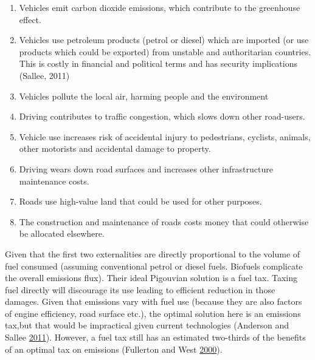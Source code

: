 \documentclass[]{tufte-handout}
\providecommand{\tightlist}{%
  \setlength{\itemsep}{0pt}\setlength{\parskip}{0pt}}
\begin{document}
\begin{enumerate}
\def\labelenumi{\arabic{enumi}.}
\tightlist
\item
  Vehicles emit carbon dioxide emissions, which contribute to the
  greenhouse effect.
\item
  Vehicles use petroleum products (petrol or diesel) which are imported
  (or use products which could be exported) from unstable and
  authoritarian countries. This is costly in financial and political
  terms and has security implications (Sallee, 2011)
\item
  Vehicles pollute the local air, harming people and the environment
\item
  Driving contributes to traffic congestion, which slows down other
  road-users.
\item
  Vehicle use increases risk of accidental injury to pedestrians,
  cyclists, animals, other motorists and accidental damage to property.
\item
  Driving wears down road surfaces and increases other infrastructure
  maintenance costs.
\item
  Roads use high-value land that could be used for other purposes.
\item
  The construction and maintenance of roads costs money that could
  otherwise be allocated elsewhere.
\end{enumerate}

Given that the first two externalities are directly proportional to the
volume of fuel consumed (assuming conventional petrol or diesel fuels.
Biofuels complicate the overall emissions flux). Their ideal Pigouvian
solution is a fuel tax. Taxing fuel directly will discourage its use
leading to efficient reduction in those damages. Given that emissions
vary with fuel use (because they are also factors of engine efficiency,
road surface etc.), the optimal solution here is an emissions tax,but
that would be impractical given current technologies (Anderson and
Sallee \protect\hyperlink{ref-Anderson2011}{2011}). However, a fuel tax
still has an estimated two-thirds of the benefits of an optimal tax on
emissions (Fullerton and West
\protect\hyperlink{ref-Fullerton2000}{2000}).
\end{document}
